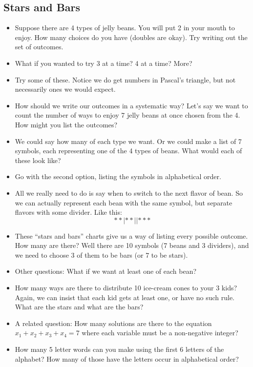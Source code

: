 \documentclass[12pt]{article}
\theoremstyle{plain}
\theoremstyle{definition}
\theoremstyle{remark}
\begin{document}
\subsection*{Stars and Bars}
\begin{itemize}

	\item Suppose there are 4 types of jelly beans.  You will put 2 in your mouth to enjoy.  How many choices do you have (doubles are okay).  Try writing out the set of outcomes.
	\item What if you wanted to try 3 at a time?  4 at a time?  More?
	\item Try some of these.  Notice we do get numbers in Pascal's triangle, but not necessarily ones we would expect.
	\item How should we write our outcomes in a systematic way? Let's say we want to count the number of ways to enjoy 7 jelly beans at once chosen from the 4.  How might you list the outcomes?
	\item We could say how many of each type we want.  Or we could make a list of 7 symbols, each representing one of the 4 types of beans.  What would each of these look like?
	\item Go with the second option, listing the symbols in alphabetical order.
	\item All we really need to do is say when to switch to the next flavor of bean.  So we can actually represent each bean with the same symbol, but separate flavors with some divider.  Like this:
	\[**|**||***\]
	\item These ``stars and bars'' charts give us a way of listing every possible outcome.  How many are there?  Well there are 10 symbols (7 beans and 3 dividers), and we need to choose 3 of them to be bars (or 7 to be stars).
	\item Other questions: What if we want at least one of each bean?
	\item How many ways are there to distribute 10 ice-cream cones to your 3 kids?  Again, we can insist that each kid gets at least one, or have no such rule.  What are the stars and what are the bars?
	\item A related question: How many solutions are there to the equation $x_1 + x_2 + x_3 + x_4 = 7$ where each variable must be a non-negative integer?
\item How many 5 letter words can you make using the first 6 letters of the alphabet?  How many of those have the letters occur in alphabetical order?


\end{itemize}
\end{document}
